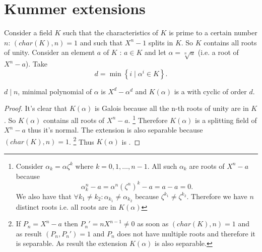 \section{Kummer extensions}
\label{sec:kummerextension}

Consider a field $K$ such that the characteristics of $K$ is prime to
a certain number $n$: $\left(char(K), n\right) = 1$ and such that $X^n
- 1$ splits in $K$. So $K$ contains all roots of unity. Consider an
element $a$ of $K$ : $a \in K$ and let $\alpha = \sqrt[n]{a}$ (i.e. a
root of $X^n - a$). Take
\begin{equation}
  d = \min{\left\{ i \mid \alpha^i \in
    K\right\}}.
  \label{eq:lec7_d}
\end{equation}

\begin{proposition}
  $d \mid n$, minimal polynomial of $\alpha$ is $X^d - \alpha^d$ and
  $K\left(\alpha\right)$ is a  with
  cyclic  of order $d$.
  \begin{proof}
    It's clear that $K\left(\alpha\right)$ is Galois because all the
    n-th roots of unity are in $K$. So $K\left(\alpha\right)$
    contains all roots of $X^n - a$.
    \footnote{
      Consider $\alpha_k = \alpha \zeta^k$ where
      $k = 0,1, \dots, n - 1$. All such $\alpha_k$ are roots of
      $X^n - a$ because
      \[
      \alpha_k^n - a = \alpha^n \left(\zeta^n\right)^k - a = a - a =0.
      \]
      We also have that $\forall k_1 \ne k_2: \alpha_{k_1} \ne
      \alpha_{k_2}$ because $\zeta^{k_1} \ne \zeta^{k_2}$. Therefore
      we have $n$ distinct roots i.e. all roots are in
      $K\left(\alpha\right)$
    }
    Therefore $K\left(\alpha\right)$
    is a splitting field of $X^n - a$ thus it's
    normal. The extension is also separable because
    $\left(char(K), n\right) = 1$.
    \footnote{
      If $P_n = X^n - a$ then $P_n' = n X^{n-1} \ne 0$ as soon as
      $\left(char(K), n\right) = 1$ and as result $(P_n, P_n') = 1$
      and $P_n$ does not have multiple roots and therefore it is
      separable. As result the extension $K\left(\alpha\right)$ is
      also separable.
    }
    Thus $K\left(\alpha\right)$ is .


\end{proof}
\end{proposition}
